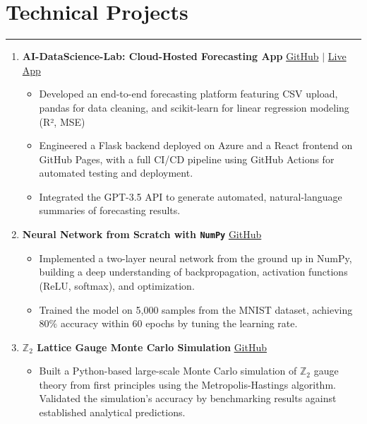 \documentclass[11pt]{article}
\begin{document}
\section*{Technical Projects}
\hrule
\vspace{-0.3em}
\begin{enumerate}
    \item \textbf{AI-DataScience-Lab: Cloud-Hosted Forecasting App}  
    \hfill \href{https://github.com/Hariprashad-Ravikumar/AI-DataScience-Lab}{GitHub} $|$ \href{https://hariprashad-ravikumar.github.io/AI-DataScience-Lab}{Live App} \\
    \vspace{-2em}
    \begin{itemize}
    \item Developed an end-to-end forecasting platform featuring CSV upload, pandas for data cleaning, and scikit-learn for linear regression modeling (R², MSE)
    \vspace{-0.5em}
    \item Engineered a Flask backend deployed on Azure and a React frontend on GitHub Pages, with a full CI/CD pipeline using GitHub Actions for automated testing and deployment.
    \vspace{-0.5em}
    \item Integrated the GPT-3.5 API to generate automated, natural-language summaries of forecasting results.
    \end{itemize}
    

    \item \textbf{Neural Network from Scratch with \texttt{NumPy}}  
    \hfill \href{https://github.com/Hariprashad-Ravikumar/Neural-Network-from-Scratch-with-NumPy}{GitHub} \\
    \vspace{-2em}
    \begin{itemize}
        \item Implemented a two-layer neural network from the ground up in NumPy, building a deep understanding of backpropagation, activation functions (ReLU, softmax), and optimization.
        \vspace{-0.5em}
        \item Trained the model on 5,000 samples from the MNIST dataset, achieving $80\%$ accuracy within 60 epochs by tuning the learning rate.
    \end{itemize}

    \item \textbf{$\mathbb{Z}_2$ Lattice Gauge Monte Carlo Simulation}  
    \hfill \href{https://github.com/Hariprashad-Ravikumar/Z2_LatticeGauge_Monte_Carlo_Simulation}{GitHub} \\
    \vspace{-2em}
    \begin{itemize}
        \item Built a Python-based large-scale Monte Carlo simulation of $\mathbb{Z}_2$ gauge theory from first principles using the Metropolis-Hastings algorithm. Validated the simulation's accuracy by benchmarking results against established analytical predictions.
    \end{itemize}
\end{enumerate}
\end{document}
